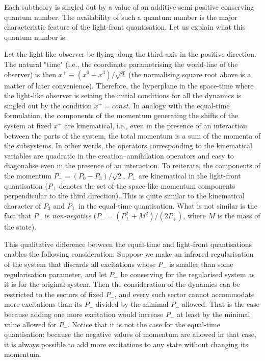 \documentclass[a4paper,12pt]{article}
\begin{document}
Each subtheory is singled out by a value of an additive 
semi-positive conserving 
quantum number. The availability of such a quantum number is 
the major characteristic feature of the light-front quantisation. 
Let us explain what 
this quantum number is.

Let the light-like observer 
be flying along the third axis 
in the positive direction. 
The natural "time" (i.e., the coordinate 
parametrising the world-line 
of the observer) is then $x^+\equiv (x^0+x^3)/\sqrt{2}$
(the normalising square root above is a matter of later convenience).
Therefore, the hyperplane in the space-time where the light-like 
observer is setting the 
initial conditions for all the dynamics is singled out by 
the condition $x^+=const$. 
In analogy with the equal-time formulation,
the components of the momentum generating the shifts of the system at
fixed $x^+$ are kinematical, i.e., even in the presence of 
an interaction between the parts of the system, the total momentum 
is a sum of the momenta of the subsystems. 
In other words, the operators corresponding to the kinematical 
variables are quadratic in the creation--annihilation operators 
and easy to diagonalise  even in the 
presence of an interaction. To reiterate, the components 
of the momentum $P_- = (P_0 - P_3)/\sqrt{2}$, $P_\perp$ are 
kinematical in the light-front quantisation
($P_\perp$ denotes the set of the space-like momentum components 
perpendicular to the third direction). 
This is quite similar to the kinematical character of 
$P_3$ and $P_\perp$ in the equal-time quantisation. 
What is not similar is the fact that 
$P_-$ is {\it non-negative} 
($P_- = (P_\perp^2 + M^2)/(2P_+)$, 
where $M$ is the mass of the state). 

This qualitative difference between the equal-time and 
light-front quantisations 
enables the following consideration: Suppose we make an infrared 
regularisation of the system that discards all excitations whose 
$P_-$ is smaller than some 
regularisation parameter, and let $P_-$ 
be conserving for 
the regularised system as 
it is for the original system. Then the consideration of the dynamics 
can be restricted to the sectors of fixed 
$P_-$, and  
every such sector cannot accommodate 
more excitations than its $P_-$ divided by the minimal $P_-$ allowed. 
That is the case because adding one more excitation would 
increase $P_-$ at least by the 
minimal value allowed for $P_-$. Notice 
that it is not the case for 
the equal-time quantisation: because the negative values of momentum 
are allowed in that case, it is always possible to add more 
excitations to any state without changing its momentum.
\end{document}
